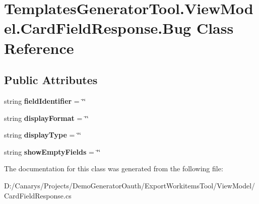 \hypertarget{class_templates_generator_tool_1_1_view_model_1_1_card_field_response_1_1_bug}{}\section{Templates\+Generator\+Tool.\+View\+Model.\+Card\+Field\+Response.\+Bug Class Reference}
\label{class_templates_generator_tool_1_1_view_model_1_1_card_field_response_1_1_bug}
\subsection*{Public Attributes}
\begin{DoxyCompactItemize}
\item 
\mbox{\label{class_templates_generator_tool_1_1_view_model_1_1_card_field_response_1_1_bug_a45b134cba54edf235be401e25245f67b}} 
string {\bfseries field\+Identifier} = \char`\"{}\char`\"{}
\item 
\mbox{\label{class_templates_generator_tool_1_1_view_model_1_1_card_field_response_1_1_bug_af3a6275a25eebf20b3cc6d52de3b1935}} 
string {\bfseries display\+Format} = \char`\"{}\char`\"{}
\item 
\mbox{\label{class_templates_generator_tool_1_1_view_model_1_1_card_field_response_1_1_bug_a8497b287089674cb21995440b3d069c4}} 
string {\bfseries display\+Type} = \char`\"{}\char`\"{}
\item 
\mbox{\label{class_templates_generator_tool_1_1_view_model_1_1_card_field_response_1_1_bug_ae53006a419a4760ba695ee2bd4e53350}} 
string {\bfseries show\+Empty\+Fields} = \char`\"{}\char`\"{}
\end{DoxyCompactItemize}


The documentation for this class was generated from the following file\+:\begin{DoxyCompactItemize}
\item 
D\+:/\+Canarys/\+Projects/\+Demo\+Generator\+Oauth/\+Export\+Workitems\+Tool/\+View\+Model/Card\+Field\+Response.\+cs\end{DoxyCompactItemize}

